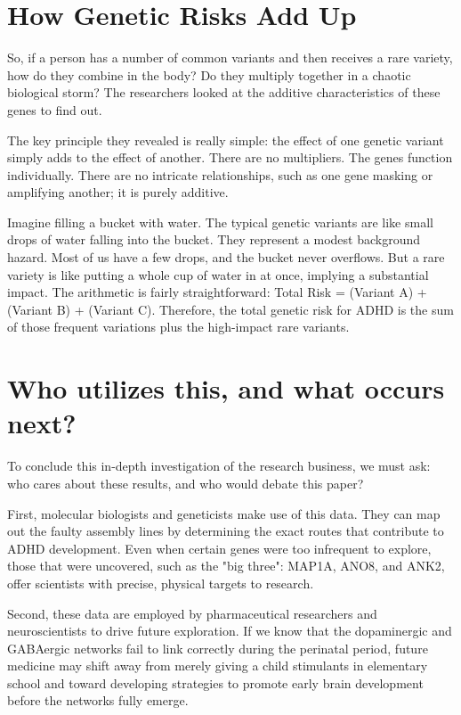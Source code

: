 \section{How Genetic Risks Add Up}  

So, if a person has a number of common variants and then receives a rare variety, how do they combine in the body?  Do they multiply together in a chaotic biological storm?  The researchers looked at the additive characteristics of these genes to find out.  

The key principle they revealed is really simple: the effect of one genetic variant simply adds to the effect of another.  There are no multipliers.  The genes function individually.  There are no intricate relationships, such as one gene masking or amplifying another; it is purely additive.  

Imagine filling a bucket with water.  The typical genetic variants are like small drops of water falling into the bucket.  They represent a modest background hazard.  Most of us have a few drops, and the bucket never overflows. 
But a rare variety is like putting a whole cup of water in at once, implying a substantial impact.  The arithmetic is fairly straightforward: Total Risk = (Variant A) + (Variant B) + (Variant C).  Therefore, the total genetic risk for ADHD is the sum of those frequent variations plus the high-impact rare variants.  

\section{Who utilizes this, and what occurs next?}  

To conclude this in-depth investigation of the research business, we must ask: who cares about these results, and who would debate this paper?  

First, molecular biologists and geneticists make use of this data.  They can map out the faulty assembly lines by determining the exact routes that contribute to ADHD development. 
Even when certain genes were too infrequent to explore, those that were uncovered, such as the "big three": MAP1A, ANO8, and ANK2, offer scientists with precise, physical targets to research.  

Second, these data are employed by pharmaceutical researchers and neuroscientists to drive future exploration. 
If we know that the dopaminergic and GABAergic networks fail to link correctly during the perinatal period, future medicine may shift away from merely giving a child stimulants in elementary school and toward developing strategies to promote early brain development before the networks fully emerge.  


